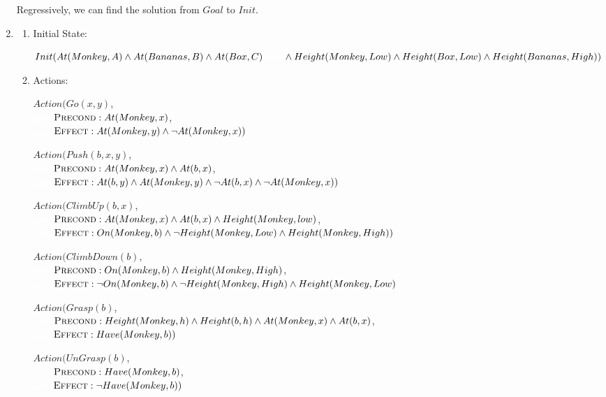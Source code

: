 \documentclass{article}
\begin{document}
\begin{enumerate}
Regressively, we can find the solution from $Goal$ to $Init$.


\item
\begin{enumerate}
	\item Initial State:
		
		$Init(At(Monkey,A) \land At(Bananas,B) \land At(Box,C) \\
		\textcolor{white}{aaaa} \land Height(Monkey,Low) \land Height(Box,Low) \land Height(Bananas,High))$

	\item Actions:

		$Action(Go(x, y)$, \\
		\textcolor{white}{aaaa}$\textsc{Precond}:At(Monkey, x)$,\\
		\textcolor{white}{aaaa}$\textsc{Effect}:At(Monkey, y) \land \neg At(Monkey, x))$

		$Action(Push(b, x, y)$, \\
		\textcolor{white}{aaaa}$\textsc{Precond}:At(Monkey, x) \land At(b,x)$, \\
		\textcolor{white}{aaaa}$\textsc{Effect}:At(b, y) \land At(Monkey, y) \land \neg At(b, x) \land \neg At(Monkey, x))$ 

		$Action(ClimbUp(b,x)$, \\
		\textcolor{white}{aaaa}$\textsc{Precond}:At(Monkey, x) \land At(b, x) \land Height(Monkey, low)$, \\
		\textcolor{white}{aaaa}$\textsc{Effect}:On(Monkey, b) \land \neg Height(Monkey,Low) \land Height(Monkey,High))$

		$Action(ClimbDown(b)$, \\
		\textcolor{white}{aaaa}$\textsc{Precond}:On(Monkey, b) \land Height(Monkey,High)$, \\
		\textcolor{white}{aaaa}$\textsc{Effect}:\neg On(Monkey, b) \land \neg Height(Monkey,High) \land Height(Monkey,Low)$
		
		$Action(Grasp(b)$, \\
		\textcolor{white}{aaaa}$\textsc{Precond}:Height(Monkey, h) \land Height(b, h) \land At(Monkey, x) \land At(b, x)$, \\
		\textcolor{white}{aaaa}$\textsc{Effect}:Have(Monkey, b))$
				
		$Action(UnGrasp(b)$, \\
		\textcolor{white}{aaaa}$\textsc{Precond}:Have(Monkey, b)$, \\
		\textcolor{white}{aaaa}$\textsc{Effect}:\neg Have(Monkey, b))$


\end{enumerate}
\end{enumerate}
\end{document}
